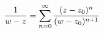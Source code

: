 \documentclass[preview]{standalone}
\begin{document}
\begin{align*}
\special{dvisvgm:raw <g id='unique000'>}\frac{1}{w-z} = \sum_{n=0}^{\infty} \frac{(z-z_0)^n}{(w-z_0)^{n+1}}\special{dvisvgm:raw </g>}
\end{align*}
\end{document}
